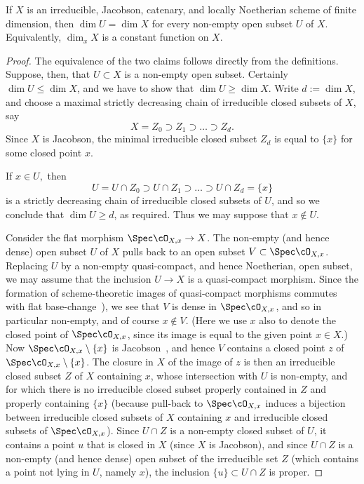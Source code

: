 \begin{alemma}
	\label{lem:constancy of dimension}
	If $X$ is an irreducible, Jacobson, catenary, and locally Noetherian
	scheme of finite dimension,
	then $\dim U = \dim X$ for every
	non-empty open subset $U$ of $X$.
	Equivalently, $\dim_x X$ is a constant function on $X$.
\end{alemma}
\begin{proof}
	The equivalence of the two claims follows directly from the
	definitions.   Suppose, then, that $U\subset X$ is a non-empty open
	subset.
	Certainly $\dim U \leq \dim X$, and we have to show
	that $\dim U \geq \dim X.$
	Write $d := \dim X$, and choose a maximal strictly
	decreasing chain of irreducible closed subsets
	of $X$, say
	$$X = Z_0 \supset Z_1 \supset \dots \supset Z_d.$$
	Since $X$ is Jacobson, the minimal irreducible closed
	subset $Z_d$ is equal to $\{x\}$ for some closed 
	point $x$. 

	If $x \in U,$ then
	$$U = U \cap Z_0  \supset U\cap Z_1 \supset \dots \supset
	U\cap Z_d = \{x\}$$
	is a strictly decreasing chain of irreducible closed 
	subsets of $U$, and so we conclude that $\dim U \geq d$,
	as required.  Thus we may suppose that $x \not\in U.$



	Consider the flat morphism $\Spec \cO_{X,x} \to X$.
	The non-empty (and hence dense) open subset $U$ of $X$
	pulls back to an open subset $V \subset \Spec \cO_{X,x}$.
	Replacing $U$ by a non-empty quasi-compact, and hence
	Noetherian, open subset, we may assume that the inclusion
	$U \to X$ is a quasi-compact morphism.  Since the
	formation of scheme-theoretic images of quasi-compact
	morphisms commutes with flat
	base-change~\cite[\href{http://stacks.math.columbia.edu/tag/081I}{Tag
                 081I}]{stacks-project}), 
	we see that $V$ is dense in $\Spec \cO_{X,x}$,
	and so in particular non-empty,
	and of course $x \not\in V.$  (Here we use $x$ also to denote
	the closed point of $\Spec \cO_{X,x}$, since its image
	is equal to the given point $x \in X$.)
	Now $\Spec \cO_{X,x} \setminus \{x\}$ is Jacobson~\cite[\href{http://stacks.math.columbia.edu/tag/02IM}{Tag
                 02IM}]{stacks-project}, 
	and hence $V$ contains a closed point $z$ 
	of $\Spec \cO_{X,x} \setminus \{x\}$.  The closure
	in $X$ of the image of $z$ is then an irreducible
	closed subset $Z$ of $X$ containing $x$, whose intersection
	with $U$ is non-empty, and
	for which there is no irreducible closed 
	subset properly contained in $Z$
	and properly containing $\{x\}$
        (because pull-back to $\Spec \cO_{X,x}$ induces
	a bijection between irreducible closed subsets of $X$
	containing $x$ and irreducible closed subsets of $\Spec
	\cO_{X,x}$).
	Since $U \cap Z$ is a non-empty closed subset of $U$,
	it contains a point $u$ that is closed in $X$ (since
	$X$ is Jacobson), and since $U\cap Z$ 
	is a non-empty (and hence dense) open subset of the irreducible set $Z$
	(which contains a point not lying in $U$, namely $x$),
	the inclusion $\{u\} \subset U\cap Z$ is proper.


\end{proof}

